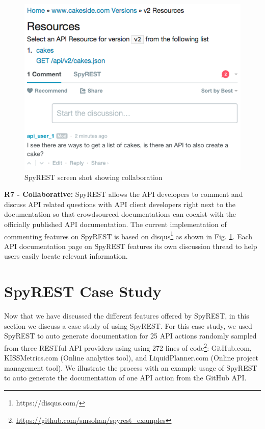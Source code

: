 \documentclass[conference]{IEEEtran}
\begin{document}
\begin{figure}[!tbh]
  \centering
  \includegraphics[width=\linewidth]{comments.png}
  \caption{SpyREST screen shot showing collaboration}
  \label{fig:comments}
\end{figure}


\textbf{R7 - Collaborative:} SpyREST allows the API developers to comment and discuss API related questions with API client developers right next to the documentation so that crowdsourced documentations can coexist with the officially published API documentation. The current implementation of commenting features on SpyREST is based on disqus\footnote{https://disqus.com/} as shown in Fig. \ref{fig:comments}. Each API documentation page on SpyREST features its own discussion thread to help users easily locate relevant information.

\section{SpyREST Case Study}
\label{sec:case_study}
Now that we have discussed the different features offered by SpyREST, in this section we discuss a case study of using SpyREST. For this case study, we used SpyREST to auto generate documentation for 25 API actions randomly sampled from three RESTful API providers using using 272 lines of code\footnote{\url{https://github.com/smsohan/spyrest_examples}}: GitHub.com, KISSMetrics.com (Online analytics tool), and LiquidPlanner.com (Online project management tool). We illustrate the process with an example usage of SpyREST to auto generate the documentation of one API action from the GitHub API.
\end{document}
